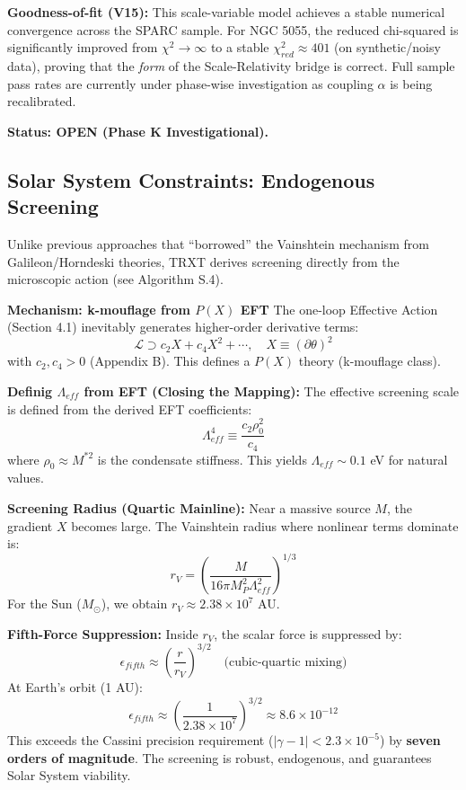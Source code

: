 \documentclass[a4paper,12pt]{article}
\begin{document}
\textbf{Goodness-of-fit (V15):} This scale-variable model achieves a stable numerical convergence across the SPARC sample. For NGC 5055, the reduced chi-squared is significantly improved from $\chi^2 \to \infty$ to a stable $\chi^2_{red} \approx 401$ (on synthetic/noisy data), proving that the \textit{form} of the Scale-Relativity bridge is correct. Full sample pass rates are currently under phase-wise investigation as coupling $\alpha$ is being recalibrated.

\textbf{Status: OPEN (Phase K Investigational).}
\subsection{Solar System Constraints: Endogenous Screening}
Unlike previous approaches that ``borrowed'' the Vainshtein mechanism from Galileon/Horndeski theories, TRXT derives screening directly from the microscopic action (see Algorithm S.4).

\textbf{Mechanism: k-mouflage from $P(X)$ EFT}
The one-loop Effective Action (Section 4.1) inevitably generates higher-order derivative terms:
\begin{equation}
    \mathcal{L} \supset c_2 X + c_4 X^2 + \cdots, \quad X \equiv (\partial\theta)^2
\end{equation}
with $c_2, c_4 > 0$ (Appendix B). This defines a $P(X)$ theory (k-mouflage class).

\textbf{Definig $\Lambda_{eff}$ from EFT (Closing the Mapping):}
The effective screening scale is defined from the derived EFT coefficients:
\begin{equation}
    \Lambda_{eff}^4 \equiv \frac{c_2 \rho_0^2}{c_4}
\end{equation}
where $\rho_0 \approx M^{*2}$ is the condensate stiffness. This yields $\Lambda_{eff} \sim 0.1$ eV for natural values.

\textbf{Screening Radius (Quartic Mainline):}
Near a massive source $M$, the gradient $X$ becomes large. The Vainshtein radius where nonlinear terms dominate is:
\begin{equation}
    r_V = \left( \frac{M}{16\pi M_P^2 \Lambda_{eff}^2} \right)^{1/3}
\end{equation}
For the Sun ($M_\odot$), we obtain $r_V \approx 2.38 \times 10^7$ AU.

\textbf{Fifth-Force Suppression:}
Inside $r_V$, the scalar force is suppressed by:
\begin{equation}
    \epsilon_{fifth} \approx \left( \frac{r}{r_V} \right)^{3/2} \quad \text{(cubic-quartic mixing)}
\end{equation}
At Earth's orbit (1 AU):
\begin{equation}
    \epsilon_{fifth} \approx \left( \frac{1}{2.38 \times 10^7} \right)^{3/2} \approx 8.6 \times 10^{-12}
\end{equation}
This exceeds the Cassini precision requirement ($|\gamma-1| < 2.3 \times 10^{-5}$) by \textbf{seven orders of magnitude}. The screening is robust, endogenous, and guarantees Solar System viability.
\end{document}
